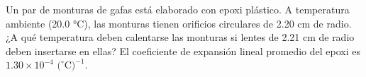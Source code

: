 \item Un par de monturas de gafas está elaborado con epoxi plástico. A temperatura ambiente (20.0 °C), las monturas tienen orificios circulares de 2.20 cm de radio. ¿A qué temperatura deben calentarse las monturas si lentes de 2.21 cm de radio deben insertarse en ellas? El coeficiente de expansión lineal promedio del epoxi es $1.30 \times 10^{-4} \text{ (}^\circ\text{C)}^{-1}$.
